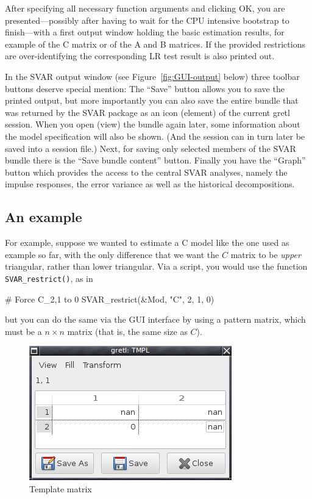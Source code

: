 \documentclass[a4paper,10pt]{article}
\newcommand{\app}[1]{\textsf{#1}}
\newcounter{script}[section]
\begin{document}
After specifying all necessary function arguments and clicking OK, you
are presented---possibly after having to wait for the CPU intensive
bootstrap to finish---with a first output window holding the basic
estimation results, for example of the C matrix or of the A and B
matrices. If the provided restrictions are over-identifying the
corresponding LR test result is also printed out.

In the SVAR output window (see Figure~\ref{fig:GUI-output} below)
three toolbar buttons deserve special mention: The ``Save'' button
allows you to save the printed output, but more importantly you can
also save the entire bundle that was returned by the SVAR package as
an icon (element) of the current \app{gretl} session. When you open
(view) the bundle again later, some information about the model
specification will also be shown. (And the session can in turn later
be saved into a session file.) Next, for saving only selected members
of the SVAR bundle there is the ``Save bundle content''
button. Finally you have the ``Graph'' button which provides the
access to the central SVAR analyses, namely the impulse responses, the
error variance as well as the historical decompositions.

\subsection{An example}

For example, suppose we wanted to estimate a C model like the one used
as example so far, with the only difference that we want the $C$
matrix to be \emph{upper} triangular, rather than lower
triangular. Via a script, you would use the function
\texttt{SVAR\_restrict()}, as in
\begin{code}
# Force C_{2,1} to 0
SVAR_restrict(&Mod, "C", 2, 1, 0)
\end{code}
but you can do the same via the GUI interface by using a pattern
matrix, which must be a $n \times n$ matrix (that is, the same
size as $C$). 

\begin{figure}[htbp]
  \centering
  \includegraphics[scale=0.5]{TMPL.png}
  \caption{Template matrix}
  \label{fig:tmpl}
\end{figure}
\end{document}
